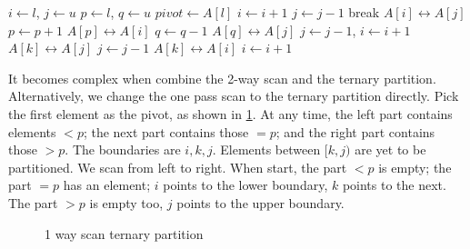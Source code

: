 \documentclass[b5paper]{article}
\begin{document}
\begin{algorithmic}[1]
    \State $i \gets l$, $j \gets u$
    \State $p \gets l$, $q \gets u$ 
    \State $pivot \gets A[l]$
    \Loop
      \Repeat
        \State $i \gets i + 1$
       
      \Repeat
        \State $j \gets j - 1$
       
        \State break
      \EndIf
      \State {} $A[i] \leftrightarrow A[j]$
       
        \State $p \gets p + 1$
        \State {} $A[p] \leftrightarrow A[i]$
      \EndIf
        \State $q \gets q - 1$
        \State {} $A[q] \leftrightarrow A[j]$
      \EndIf
    \EndLoop
      \State $j \gets j - 1$, $i \gets i + 1$
    \EndIf
     
      \State {} $A[k] \leftrightarrow A[j]$
      \State $j \gets j - 1$
    \EndFor
      \State {} $A[k] \leftrightarrow A[i]$
      \State $i \gets i + 1$
    \EndFor
    \State {}
    \State {}
  \EndIf
\EndProcedure
\end{algorithmic}

It becomes complex when combine the 2-way scan and the ternary partition. Alternatively, we change the one pass scan to the ternary partition directly. Pick the first element as the pivot, as shown in \cref{fig:partition-3-way-lomuto}. At any time, the left part contains elements $< p$; the next part contains those $= p$; and the right part contains those $> p$. The boundaries are $i, k, j$. Elements between $[k, j)$ are yet to be partitioned. We scan from left to right. When start, the part $< p$ is empty; the part $= p$ has an element; $i$ points to the lower boundary, $k$ points to the next. The part $> p$ is empty too, $j$ points to the upper boundary.

\begin{figure}[htbp]
   \centering
   \caption{1 way scan ternary partition}
   \label{fig:partition-3-way-lomuto}
\end{figure}
\end{document}
